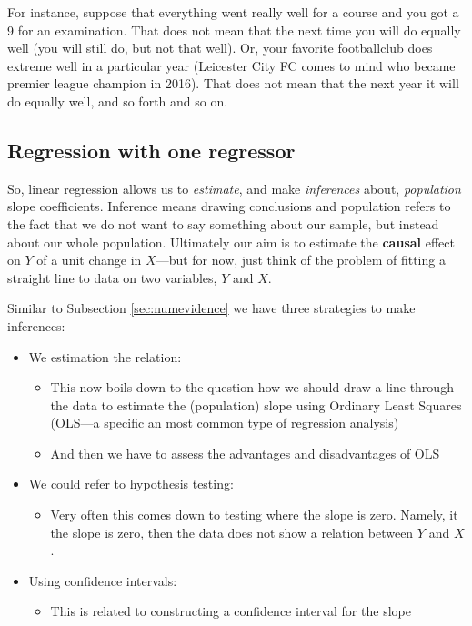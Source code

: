 \documentclass[
]{book}
\providecommand{\tightlist}{%
  \setlength{\itemsep}{0pt}\setlength{\parskip}{0pt}}
\begin{document}
For instance, suppose that everything went really well for a course and you got a 9 for an examination. That does not mean that the next time you will do equally well (you will still do, but not that well). Or, your favorite footballclub does extreme well in a particular year (Leicester City FC comes to mind who became premier league champion in 2016). That does not mean that the next year it will do equally well, and so forth and so on.

\hypertarget{regression-with-one-regressor}{%
\subsection{Regression with one regressor}\label{regression-with-one-regressor}}

So, linear regression allows us to \emph{estimate}, and make \emph{inferences} about, \emph{population} slope coefficients. Inference means drawing conclusions and population refers to the fact that we do not want to say something about our sample, but instead about our whole population. Ultimately our aim
is to estimate the \textbf{causal} effect on \(Y\) of a unit change in \(X\)---but for now, just think of the problem of fitting a straight line to data on two variables, \(Y\) and \(X\).

Similar to Subsection \ref{sec:numevidence} we have three strategies to make inferences:

\begin{itemize}
\tightlist
\item
  We estimation the relation:

  \begin{itemize}
  \tightlist
  \item
    This now boils down to the question how we should draw a line through the data to estimate the (population) slope using Ordinary Least Squares (OLS---a specific an most common type of regression analysis)
  \item
    And then we have to assess the advantages and disadvantages of OLS
  \end{itemize}
\item
  We could refer to hypothesis testing:

  \begin{itemize}
  \tightlist
  \item
    Very often this comes down to testing where the slope is zero. Namely, it the slope is zero, then the data does not show a relation between \(Y\) and \(X\).
  \end{itemize}
\item
  Using confidence intervals:

  \begin{itemize}
  \tightlist
  \item
    This is related to constructing a confidence interval for the slope
  \end{itemize}
\end{itemize}
\end{document}
